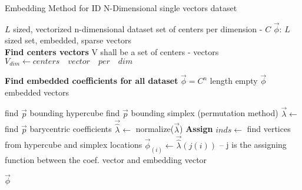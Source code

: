 \begin{algorithm}
		\caption{Embedding Method for ID N-Dimensional single vectors dataset}
		\begin{algorithmic}
 
		
		\REQUIRE $L$ sized, vectorized n-dimensional dataset
		\REQUIRE set of centers per dimension - $C$
		\ENSURE $\overrightarrow{\phi}$: $L$ sized set, embedded, sparse vectors\\
		
		\STATE \textbf{Find centers vectors}
		\STATE V shall be a set of centers - vectors
		\STATE $V_{dim} \leftarrow centers \quad vector \quad per \quad dim$
		\ENDFOR
		
		\STATE \textbf{Find embedded coefficients for all dataset}
		\STATE $\overrightarrow{\phi} = C^{n}$ length empty $\overrightarrow{\phi}$ embedded vectors
		
		\STATE find $\overrightarrow{p}$ bounding hypercube 
		\STATE find $\overrightarrow{p}$ bounding simplex (permutation method)
		\STATE $\overrightarrow{\lambda} \leftarrow$ find $\overrightarrow{p}$ barycentric coefficients 
		\STATE $\overrightarrow{\hat{\lambda}} \leftarrow$ normalize($\overrightarrow{\lambda}$)
		\ENDFOR
		\STATE \textbf{Assign}
		\STATE $inds \leftarrow$ find vertices from hypercube and simplex locations
		\STATE $\overrightarrow{\phi}_{(i)} \leftarrow \overrightarrow{\hat{\lambda}}(j(i))$ -- j is the assigning function between the coef. vector and embedding vector
		\ENDFOR
		\ENDFOR
		
		\RETURN $\overrightarrow{\phi}$

		
		\end{algorithmic}
	\end{algorithm}